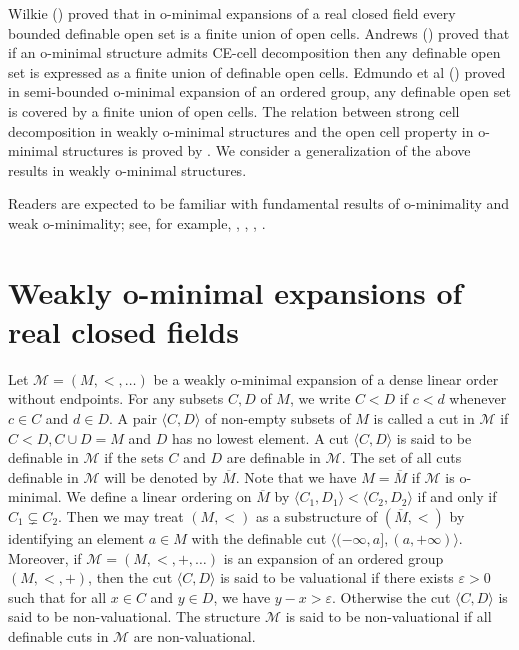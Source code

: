 \documentclass{amsart}
\theoremstyle{definition}
\theoremstyle{plain}
\newcommand{\cM}{\mathcal M}
\newcommand{\ov}[1]{\overline{#1}}
\begin{document}
Wilkie  (\cite{Wi}) proved that in o-minimal expansions of a real closed field
every bounded definable open set is a finite union of open cells.
Andrews (\cite{A}) proved that if an o-minimal structure admits
CE-cell decomposition then any definable open set is expressed as
a finite union of definable open cells.
Edmundo et al (\cite{EEP}) proved in semi-bounded o-minimal expansion of an ordered group,
any definable open set is covered by a finite union of open cells.
The relation between strong cell decomposition in weakly o-minimal structures and 
the open cell property in o-minimal structures is proved by \cite{ET}.
We consider a generalization of the above results in weakly o-minimal structures.

Readers are expected to be familiar with 
fundamental results of o-minimality and weak o-minimality; 
see, for example, \cite{C},  \cite{D}, \cite{MMS}, \cite{W1}.



\section{Weakly o-minimal expansions of real closed fields}





Let $\mathcal M = (M, <, \ldots)$ be a weakly o-minimal expansion of a dense linear order without endpoints.
For any subsets $C, D$ of $M$,
we write $C < D$ if $c < d$ whenever $c \in C$ and $d \in D$.
A pair $\langle C, D \rangle$ of non-empty subsets of $M$ is called
a cut in $\mathcal M$
if $C < D, C \cup D = M$ and $D$ has no lowest element.
A cut $\langle C, D \rangle$ is said to be definable in $\cM$
if the sets $C$ and $D$ are definable in $\cM$.
The set of all cuts definable in $\cM$ will be denoted by $\ov{M}$.
Note that we have $M = \ov{M}$ if $\cM$ is o-minimal.
We define a linear ordering on $\overline{M}$ by 
$\langle C_1, D_1 \rangle < \langle C_2, D_2 \rangle$ 
if and only if $C_1 \subsetneq C_2$.
Then we may treat $(M, <)$ as a substructure of $(\overline{M}, <)$
by identifying an element $a \in M$ with 
the definable cut $\langle (-\infty, a], (a, +\infty) \rangle$.
Moreover, if $\mathcal M = (M, <, +, \ldots)$ is an expansion of an ordered group $(M, <, +)$,
then the cut $\langle C, D \rangle$ is said to be valuational 
if there exists $\varepsilon > 0$ such that for all $x\in C$ and $y \in D$, we have $y-x > \varepsilon$.
Otherwise the cut $\langle C, D \rangle$ is said to be non-valuational.
The structure $\cM$ is said to be non-valuational if
all definable cuts in $\cM$ are non-valuational.
\end{document}
